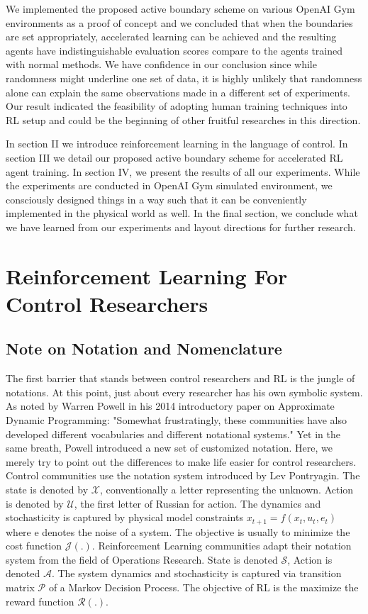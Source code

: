 \documentclass[journal]{IEEEtran}
\begin{document}
We implemented the proposed active boundary scheme on various OpenAI Gym environments as a proof of concept and we concluded that when the boundaries are set appropriately, accelerated learning can be achieved and the resulting agents have indistinguishable evaluation scores compare to the agents trained with normal methods. We have confidence in our conclusion since while randomness might underline one set of data, it is highly unlikely that randomness alone can explain the same observations made in a different set of experiments. Our result indicated the feasibility of adopting human training techniques into RL setup and could be the beginning of other fruitful researches in this direction.

In section II we introduce reinforcement learning in the language of control. In section III we detail our proposed active boundary scheme for accelerated RL agent training. In section IV, we present the results of all our experiments. While the experiments are conducted in OpenAI Gym simulated environment, we consciously designed things in a way such that it can be conveniently implemented in the physical world as well. In the final section, we conclude what we have learned from our experiments and layout directions for further research.

\section{Reinforcement Learning For Control Researchers}

\subsection{Note on Notation and Nomenclature}
The first barrier that stands between control researchers and RL is the jungle of notations. At this point, just about every researcher has his own symbolic system. As noted by Warren Powell in his 2014 introductory paper on Approximate Dynamic Programming: "Somewhat frustratingly, these communities have also developed different vocabularies and different notational systems." Yet in the same breath, Powell introduced a new set of customized notation. \cite{Powell2009WhatYS} Here, we merely try to point out the differences to make life easier for control researchers. Control communities use the notation system introduced by Lev Pontryagin. The state is denoted by $ \mathcal{X}$, conventionally a letter representing the unknown. Action is denoted by $\mathcal{U}$, the first letter of Russian for action. The dynamics and stochasticity is captured by physical model constraints $x_{t+1}=f(x_t,u_t,e_t)$ where e denotes the noise of a system. The objective is usually to minimize the cost function $\mathcal{J(.)}$. Reinforcement Learning communities adapt their notation system from the field of Operations Research. State is denoted $\mathcal{S}$, Action is denoted $\mathcal{A}$. The system dynamics and stochasticity is captured via transition matrix $\mathcal{P}$ of a Markov Decision Process. The objective of RL is the maximize the reward function $\mathcal{R(.)}$. 
\end{document}
